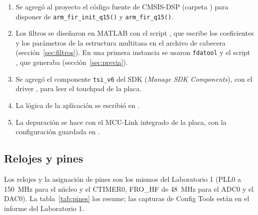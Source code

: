 \documentclass[11pt,a4paper]{article}
\begin{document}
\begin{enumerate}[nosep]
  \item Se agregó al proyecto el código fuente de CMSIS-DSP (carpeta
        ) para disponer de \texttt{arm\_fir\_init\_q15()} y
        \texttt{arm\_fir\_q15()}.
  \item Los filtros se diseñaron en MATLAB con el script
        , que escribe los coeficientes y los
        parámetros de la estructura multitasa en el archivo de cabecera
         (sección~\ref{sec:filtros}). En una
        primera instancia se usaron \texttt{fdatool} y el script
        , que generaba 
        (sección~\ref{sec:previa}).
  \item Se agregó el componente \texttt{tsi\_v6} del SDK (\emph{Manage SDK
        Components}), con el driver , para leer el
        touchpad de la placa.
  \item La lógica de la aplicación se escribió en .
  \item La depuración se hace con el MCU-Link integrado de la placa, con la
        configuración guardada en .
\end{enumerate}

\subsection{Relojes y pines}

Los relojes y la asignación de pines son los mismos del Laboratorio 1 (PLL0 a
\qty{150}{\mega\hertz} para el núcleo y el CTIMER0, FRO\_HF de
\qty{48}{\mega\hertz} para el ADC0 y el DAC0). La tabla~\ref{tab:pines} los
resume; las capturas de Config Tools están en el informe del Laboratorio 1.
\end{document}

